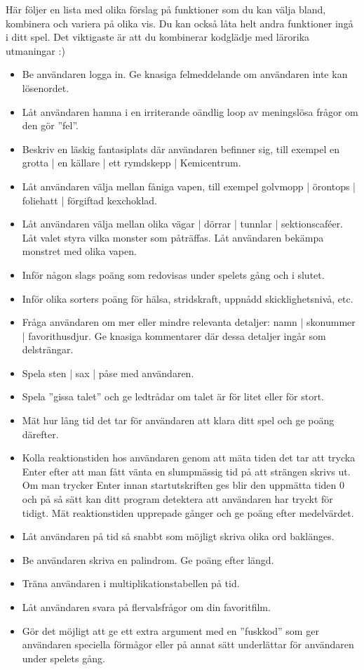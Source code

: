 Här följer en lista med olika förslag på funktioner som du kan välja bland, kombinera och variera på olika vis. Du kan också låta helt andra funktioner ingå i ditt spel. Det viktigaste är att du kombinerar kodglädje med lärorika utmaningar :)

\begin{itemize}
\item Be användaren logga in. Ge knasiga felmeddelande om användaren inte kan lösenordet.
\item Låt användaren hamna i en irriterande oändlig loop av meningslösa frågor om den gör ''fel''.
\item Beskriv en läskig fantasiplats där användaren befinner sig, till exempel en grotta | en källare | ett rymdskepp | Kemicentrum.
\item Låt användaren välja mellan fåniga vapen, till exempel golvmopp | örontops | foliehatt | förgiftad kexchoklad.
\item Låt användaren välja mellan olika vägar | dörrar | tunnlar | sektionscaféer. Låt valet styra vilka monster som påträffas. Låt användaren bekämpa monstret med olika vapen.
\item Inför någon slags poäng som redovisas under spelets gång och i slutet.
\item Inför olika sorters poäng för hälsa, stridskraft, uppnådd skicklighetsnivå, etc.
\item Fråga användaren om mer eller mindre relevanta detaljer: namn | skonummer | favorithusdjur. Ge knasiga kommentarer där dessa detaljer ingår som delsträngar.
\item Spela sten | sax | påse med användaren.
\item Spela ''gissa talet'' och ge ledtrådar om talet är för litet eller för stort.
\item Mät hur lång tid det tar för användaren att klara ditt spel och ge poäng därefter.
\item Kolla reaktionstiden hos användaren genom att mäta tiden det tar att trycka Enter efter att man fått vänta en slumpmässig tid på att strängen  skrivs ut. Om man trycker Enter innan startutskriften ges blir den uppmätta tiden 0 och på så sätt kan ditt program detektera att användaren har tryckt för tidigt. Mät reaktionstiden upprepade gånger och ge poäng efter medelvärdet.
\item Låt användaren på tid så snabbt som möjligt skriva olika ord baklänges.
\item Be användaren skriva en palindrom. Ge poäng efter längd.
\item Träna användaren i multiplikationstabellen på tid.
\item Låt användaren svara på flervalsfrågor om din favoritfilm.
\item Gör det möjligt att ge ett extra argument med en ''fuskkod'' som ger användaren speciella förmågor eller på annat sätt underlättar för användaren under spelets gång.
\end{itemize}


